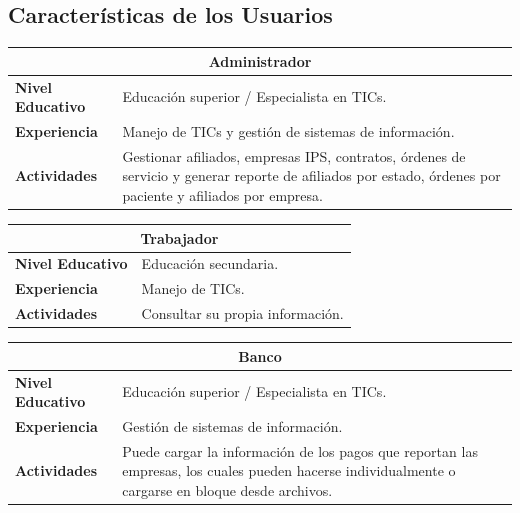 \documentclass[12pt,a4paper]{article}
\begin{document}
\subsection{Características de los Usuarios}
\begin{center}
\begin{tabular}{|l| p{12cm}|}
\hline 
\multicolumn{2}{|c|}{\textbf{Administrador}} \\ 
\hline 
\textbf{Nivel Educativo} & Educación superior / Especialista en TICs.\\ 
\hline 
\textbf{Experiencia} & Manejo de TICs y gestión de sistemas de información. \\ 
\hline 
\textbf{Actividades} & Gestionar afiliados, empresas IPS, contratos, órdenes de servicio y generar reporte de afiliados por estado, órdenes por paciente y afiliados por empresa. \\ 
\hline 
\end{tabular}
\vspace{5mm}

\begin{tabular}{|l| p{12cm}|}
\hline 
\multicolumn{2}{|c|}{\textbf{Trabajador}} \\ 
\hline 
\textbf{Nivel Educativo} & Educación secundaria.\\ 
\hline 
\textbf{Experiencia} & Manejo de TICs.\\ 
\hline 
\textbf{Actividades} & Consultar su propia información.\\ 
\hline 
\end{tabular}
\vspace{5mm}

\begin{tabular}{|l| p{12cm}|}
\hline 
\multicolumn{2}{|c|}{\textbf{Banco}} \\ 
\hline 
\textbf{Nivel Educativo} & Educación superior / Especialista en TICs.\\ 
\hline 
\textbf{Experiencia} & Gestión de sistemas de información.\\ 
\hline 
\textbf{Actividades} & Puede cargar la información de los pagos que reportan las empresas, los cuales pueden hacerse individualmente o cargarse en bloque desde archivos.\\ 
\hline 
\end{tabular}
\vspace{5mm}
\end{center}
\end{document}
